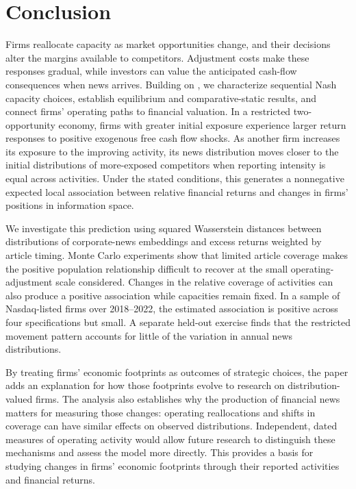 \section{Conclusion}\label{sec:conclusion}

Firms reallocate capacity as market opportunities change, and their decisions
alter the margins available to competitors.
Adjustment costs make these responses gradual, while investors can value the
anticipated cash-flow consequences when news arrives.
Building on \citet{xu_zenou_zhou_conflict_2022}, we characterize sequential
Nash capacity choices, establish equilibrium and comparative-static results,
and connect firms' operating paths to financial valuation.
In a restricted two-opportunity economy, firms with greater initial exposure
experience larger return responses to positive exogenous free cash flow shocks.
As another firm increases its exposure to the improving activity, its news
distribution moves closer to
the initial distributions of more-exposed competitors when reporting
intensity is equal across activities.
Under the stated conditions, this generates a nonnegative expected local
association between relative financial returns and changes in firms'
positions in information space.

We investigate this prediction using squared Wasserstein distances between
distributions of corporate-news embeddings and excess returns weighted by
article timing.
Monte Carlo experiments show that limited article coverage makes the positive
population relationship difficult to recover at the small
operating-adjustment scale considered.
Changes in the relative coverage of activities can also produce a positive
association while capacities remain fixed.
In a sample of  Nasdaq-listed firms over 2018--2022, the
estimated association is positive across four specifications but small.
A separate held-out exercise finds that the restricted movement pattern
accounts for little of the variation in annual news distributions.

By treating firms' economic footprints as outcomes of strategic choices, the
paper adds an explanation for how those footprints evolve to research on
distribution-valued firms.
The analysis also establishes why the production of financial news matters
for measuring those changes: operating reallocations and shifts in coverage
can have similar effects on observed distributions.
Independent, dated measures of operating activity would allow future research
to distinguish these mechanisms and assess the model more directly.
This provides a basis for studying changes in firms' economic footprints
through their reported activities and financial returns.
